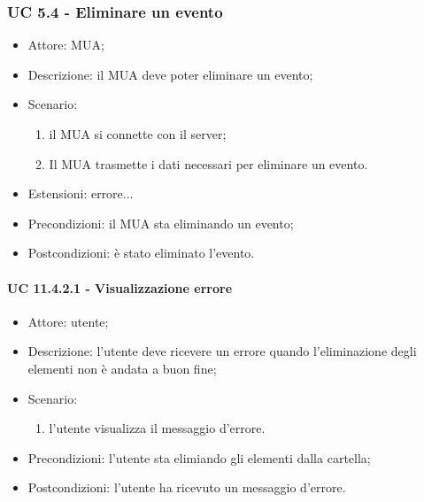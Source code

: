     \subsubsection{UC 5.4 - Eliminare un evento} \label{sec: UC 5.4}
    \begin{itemize}
        \item Attore: MUA;
        \item Descrizione: il MUA deve poter eliminare un evento;
        \item Scenario:
        \begin{enumerate}
        \item il MUA si connette con il server;
        \item Il MUA trasmette i dati necessari per eliminare un evento.
        \end{enumerate}
        \item Estensioni: errore...
        \item Precondizioni: il MUA sta eliminando un evento;
        \item Postcondizioni: è stato eliminato l'evento.
    \end{itemize}



    \paragraph{UC 11.4.2.1 - Visualizzazione errore} \label{sec: UC 11.4.2.1}
    \begin{itemize}
        \item Attore: utente;
        \item Descrizione: l'utente deve ricevere un errore quando l'eliminazione degli elementi non è andata a buon fine;
        \item Scenario:
        \begin{enumerate}
        \item l'utente visualizza il messaggio d'errore.
        \end{enumerate}   
        \item Precondizioni: l'utente sta elimiando gli elementi dalla cartella;
        \item Postcondizioni: l'utente ha ricevuto un messaggio d'errore.
    \end{itemize}


